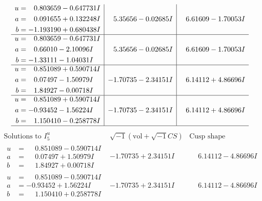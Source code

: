 \documentclass[1p]{elsarticle_modified}
\theoremstyle{definition}
\newcommand{\I}{\sqrt{-1}}
\begin{document}
$$\begin{array}{c|c|c}
\begin{aligned}
u &= \phantom{-}0.803659 - 0.647731 I \\
a &= \phantom{-}0.091655 + 0.132248 I \\
b &= -1.193190 + 0.680438 I\end{aligned}
 & \phantom{-}5.35656 - 0.02685 I & \phantom{-}6.61609 - 1.70053 I \\ \hline\begin{aligned}
u &= \phantom{-}0.803659 - 0.647731 I \\
a &= \phantom{-}0.66010 - 2.10096 I \\
b &= -1.33111 - 1.04031 I\end{aligned}
 & \phantom{-}5.35656 - 0.02685 I & \phantom{-}6.61609 - 1.70053 I \\ \hline\begin{aligned}
u &= \phantom{-}0.851089 + 0.590714 I \\
a &= \phantom{-}0.07497 - 1.50979 I \\
b &= \phantom{-}1.84927 - 0.00718 I\end{aligned}
 & -1.70735 - 2.34151 I & \phantom{-}6.14112 + 4.86696 I \\ \hline\begin{aligned}
u &= \phantom{-}0.851089 + 0.590714 I \\
a &= -0.93452 - 1.56224 I \\
b &= \phantom{-}1.150410 - 0.258778 I\end{aligned}
 & -1.70735 - 2.34151 I & \phantom{-}6.14112 + 4.86696 I\\
 \hline 
 \end{array}$$\newpage$$\begin{array}{c|c|c}  
\text{Solutions to }I^u_{5}& \I (\text{vol} + \sqrt{-1}CS) & \text{Cusp shape}\\
 \hline 
\begin{aligned}
u &= \phantom{-}0.851089 - 0.590714 I \\
a &= \phantom{-}0.07497 + 1.50979 I \\
b &= \phantom{-}1.84927 + 0.00718 I\end{aligned}
 & -1.70735 + 2.34151 I & \phantom{-}6.14112 - 4.86696 I \\ \hline\begin{aligned}
u &= \phantom{-}0.851089 - 0.590714 I \\
a &= -0.93452 + 1.56224 I \\
b &= \phantom{-}1.150410 + 0.258778 I\end{aligned}
 & -1.70735 + 2.34151 I & \phantom{-}6.14112 - 4.86696 I \\ \hline\begin{aligned}

\end{aligned}
\end{array}$$
\end{document}
